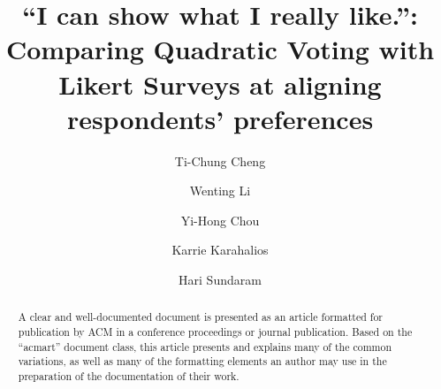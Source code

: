 \documentclass[format=acmsmall, natbib=false, anonymous=true]{acmart}
\begin{document}
\title[QV vs Likert]{``\textellipsis I can show what I really like.'': 
Comparing Quadratic Voting with Likert Surveys at aligning respondents' preferences}


\author{Ti-Chung Cheng}

\author{Wenting Li}
\authornotemark[1]

\author{Yi-Hong Chou}

\author{Karrie Karahalios}

\author{Hari Sundaram}

\renewcommand{\shortauthors}{Ti-Chung Cheng and Wenting Li, et al.}

\begin{abstract}
  A clear and well-documented document is presented as an
  article formatted for publication by ACM in a conference proceedings
  or journal publication. Based on the ``acmart'' document class, this
  article presents and explains many of the common variations, as well
  as many of the formatting elements an author may use in the
  preparation of the documentation of their work.
\end{abstract}
\end{document}
